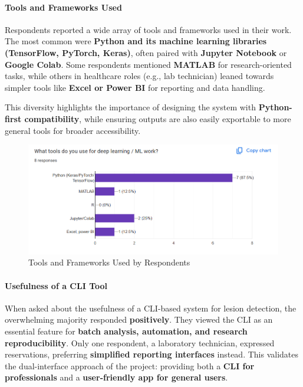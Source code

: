 \documentclass[
  12pt,
  oneside]{article}
\begin{document}
\paragraph{Tools and Frameworks Used}\label{tools-and-frameworks-used}

Respondents reported a wide array of tools and frameworks used in their
work. The most common were \textbf{Python and its machine learning
libraries (TensorFlow, PyTorch, Keras)}, often paired with
\textbf{Jupyter Notebook} or \textbf{Google Colab}. Some respondents
mentioned \textbf{MATLAB} for research-oriented tasks, while others in
healthcare roles (e.g., lab technician) leaned towards simpler tools
like \textbf{Excel or Power BI} for reporting and data handling.

This diversity highlights the importance of designing the system with
\textbf{Python-first compatibility}, while ensuring outputs are also
easily exportable to more general tools for broader accessibility.

\begin{figure}

{\centering \includegraphics[width=1\linewidth]{technical-user-chart3} 

}

\caption{Tools and Frameworks Used by Respondents}\label{fig:unnamed-chunk-10}
\end{figure}

\paragraph{Usefulness of a CLI Tool}\label{usefulness-of-a-cli-tool}

When asked about the usefulness of a CLI-based system for lesion
detection, the overwhelming majority responded \textbf{positively}. They
viewed the CLI as an essential feature for \textbf{batch analysis,
automation, and research reproducibility}. Only one respondent, a
laboratory technician, expressed reservations, preferring
\textbf{simplified reporting interfaces} instead. This validates the
dual-interface approach of the project: providing both a \textbf{CLI for
professionals} and a \textbf{user-friendly app for general users}.
\end{document}
